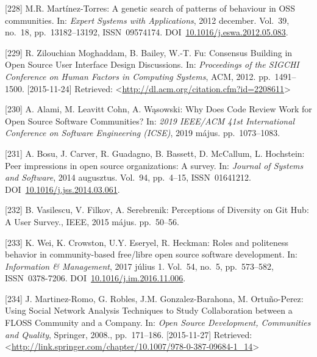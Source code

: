 \documentclass[12pt,magyar,a4paper,oneside]{scrreprt}
\newenvironment{cslreferences}%
  {}%
  {\par}
\begin{document}
\begin{cslreferences}
\leavevmode\hypertarget{ref-martinez-torres_genetic_2012}{}%
{[}228{]} M.R. Martínez-Torres: A genetic search of patterns of
behaviour in OSS communities. In: \emph{Expert Systems with
Applications}, 2012 december. Vol.~39, no.~18, pp.~13182--13192,
ISSN~09574174.
DOI~\href{https://doi.org/10.1016/j.eswa.2012.05.083}{10.1016/j.eswa.2012.05.083}.

\leavevmode\hypertarget{ref-zilouchian_moghaddam_consensus_2012}{}%
{[}229{]} R. Zilouchian Moghaddam, B. Bailey, W.-T. Fu: Consensus
Building in Open Source User Interface Design Discussions. In:
\emph{Proceedings of the SIGCHI Conference on Human Factors in Computing
Systems}, ACM, 2012. pp.~1491--1500. {[}2015-11-24{]} Retrieved:
\textless{}\url{http://dl.acm.org/citation.cfm?id=2208611}\textgreater{}

\leavevmode\hypertarget{ref-alami_why_2019}{}%
{[}230{]} A. Alami, M. Leavitt Cohn, A. Wąsowski: Why Does Code Review
Work for Open Source Software Communities? In: \emph{2019 IEEE/ACM 41st
International Conference on Software Engineering (ICSE)}, 2019 május.
pp.~1073--1083.

\leavevmode\hypertarget{ref-bosu_peer_2014}{}%
{[}231{]} A. Bosu, J. Carver, R. Guadagno, B. Bassett, D. McCallum, L.
Hochstein: Peer impressions in open source organizations: A survey. In:
\emph{Journal of Systems and Software}, 2014 augusztus. Vol.~94,
pp.~4--15, ISSN~01641212.
DOI~\href{https://doi.org/10.1016/j.jss.2014.03.061}{10.1016/j.jss.2014.03.061}.

\leavevmode\hypertarget{ref-vasilescu_perceptions_2015}{}%
{[}232{]} B. Vasilescu, V. Filkov, A. Serebrenik: Perceptions of
Diversity on Git Hub: A User Survey., IEEE, 2015 május. pp.~50--56.

\leavevmode\hypertarget{ref-wei_roles_2017}{}%
{[}233{]} K. Wei, K. Crowston, U.Y. Eseryel, R. Heckman: Roles and
politeness behavior in community-based free/libre open source software
development. In: \emph{Information \& Management}, 2017 július 1.
Vol.~54, no.~5, pp.~573--582, ISSN~0378-7206.
DOI~\href{https://doi.org/10.1016/j.im.2016.11.006}{10.1016/j.im.2016.11.006}.

\leavevmode\hypertarget{ref-martinez-romo_using_2008}{}%
{[}234{]} J. Martinez-Romo, G. Robles, J.M. Gonzalez-Barahona, M.
Ortuño-Perez: Using Social Network Analysis Techniques to Study
Collaboration between a FLOSS Community and a Company. In: \emph{Open
Source Development, Communities and Quality}, Springer, 2008.,
pp.~171--186. {[}2015-11-27{]} Retrieved:
\textless{}\url{http://link.springer.com/chapter/10.1007/978-0-387-09684-1_14}\textgreater{}


\end{cslreferences}
\end{document}
